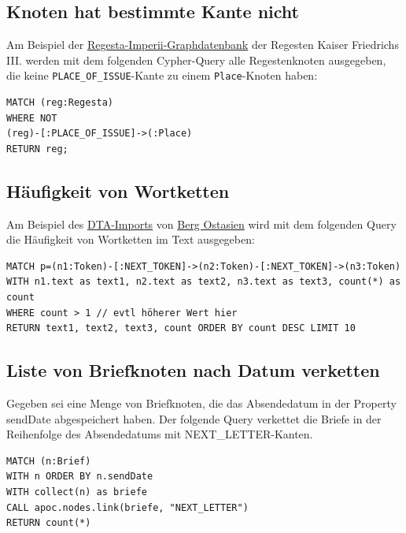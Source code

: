 \documentclass[12pt,ngerman,]{article}
\begin{document}
\subsection{Knoten hat bestimmte Kante
nicht}\label{knoten-hat-bestimmte-kante-nicht}

Am Beispiel der
\href{http://134.176.70.65:10210/browser/}{Regesta-Imperii-Graphdatenbank}
der Regesten Kaiser Friedrichs III. werden mit dem folgenden
Cypher-Query alle Regestenknoten ausgegeben, die keine
\texttt{PLACE\_OF\_ISSUE}-Kante zu einem \texttt{Place}-Knoten haben:

\begin{verbatim}
MATCH (reg:Regesta)
WHERE NOT
(reg)-[:PLACE_OF_ISSUE]->(:Place)
RETURN reg;
\end{verbatim}

\subsection{Häufigkeit von
Wortketten}\label{huxe4ufigkeit-von-wortketten}

Am Beispiel des \href{http://134.176.70.65:10220/browser/}{DTA-Imports}
von
\href{http://www.deutschestextarchiv.de/book/show/berg_ostasien01_1864}{Berg
Ostasien} wird mit dem folgenden Query die Häufigkeit von Wortketten im
Text ausgegeben:

\begin{verbatim}
MATCH p=(n1:Token)-[:NEXT_TOKEN]->(n2:Token)-[:NEXT_TOKEN]->(n3:Token)
WITH n1.text as text1, n2.text as text2, n3.text as text3, count(*) as count
WHERE count > 1 // evtl höherer Wert hier
RETURN text1, text2, text3, count ORDER BY count DESC LIMIT 10
\end{verbatim}

\subsection{Liste von Briefknoten nach Datum
verketten}\label{liste-von-briefknoten-nach-datum-verketten}

Gegeben sei eine Menge von Briefknoten, die das Absendedatum in der
Property sendDate abgespeichert haben. Der folgende Query verkettet die
Briefe in der Reihenfolge des Absendedatums mit NEXT\_LETTER-Kanten.

\begin{verbatim}
MATCH (n:Brief) 
WITH n ORDER BY n.sendDate
WITH collect(n) as briefe
CALL apoc.nodes.link(briefe, "NEXT_LETTER")
RETURN count(*)
\end{verbatim}
\end{document}
